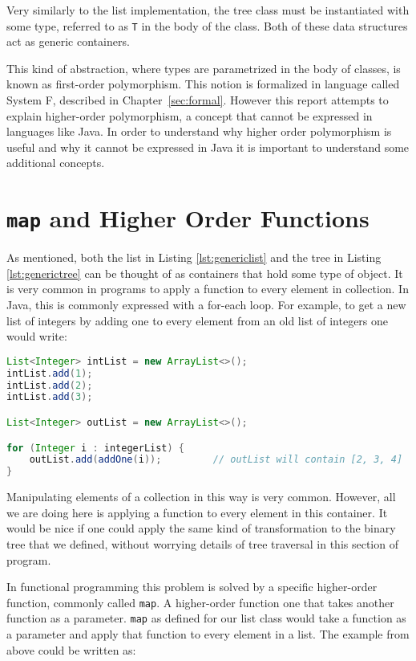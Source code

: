 Very similarly to the list implementation, the tree class must be instantiated
with some type, referred to as \lstinline{T} in the body of the class.
Both of these data structures act as generic containers.

This kind of abstraction, where types are parametrized in the body of classes,
is known as first-order polymorphism. This notion is formalized in language
called System F, described in Chapter~\ref{sec:formal}. However this report
attempts to explain higher-order polymorphism, a concept that cannot be
expressed in languages like Java. In order to understand why higher order
polymorphism is useful and why it cannot be expressed in Java it is important
to understand some additional concepts.

\section{\texttt{map} and Higher Order Functions}\label{sec:hof}
As mentioned, both the list in Listing \ref{lst:genericlist} and the tree in
Listing \ref{lst:generictree} can be thought of as containers that hold some
type of object. It is very common in programs to apply a function to every
element in collection. In Java, this is commonly expressed with a for-each
loop. For example, to get a new list of integers by adding one to every element
from an old list of integers one would write:

\begin{lstlisting}[nolol, language=Java, label={lst:forloop}]
List<Integer> intList = new ArrayList<>();
intList.add(1);
intList.add(2);
intList.add(3);

List<Integer> outList = new ArrayList<>();

for (Integer i : integerList) {
    outList.add(addOne(i));         // outList will contain [2, 3, 4]
}
\end{lstlisting}

Manipulating elements of a collection in this way is very common. However, all
we are doing here is applying a function to every element in this container.
It would be nice if one could apply the same kind of transformation to the
binary tree that we defined, without worrying details of tree traversal in this
section of program.

In functional programming this problem is solved by a specific higher-order
function, commonly called \lstinline{map}.  A higher-order function one that
takes another function as a parameter. \lstinline{map} as defined for our list
class would take a function as a parameter and apply that function to every
element in a list. The example from above could be written as:

